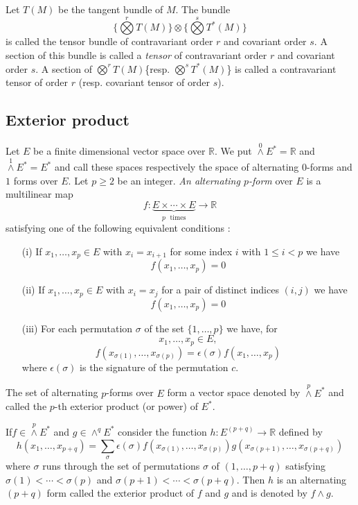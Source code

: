 Let $T(M)$ be the tangent bundle of $M$. The bundle 
$$
\{\bigotimes\limits^{r}T(M)\}\otimes \{\bigotimes\limits^{s}T^{*}(M)\}
$$ 
is called the tensor bundle of contravariant order $r$ and covariant order $s$. A section of this bundle is called a {\em tensor} of contravariant order $r$ and covariant order $s$. A section of $\bigotimes\limits^{r}T(M)$\pageoriginale \{resp. $\bigotimes\limits^{s}T^{*}(M)$\} is called a contravariant tensor of order $r$ (resp. covariant tensor of order $s$).

\subsection*{Exterior product}

Let $E$ be a finite dimensional vector space over $\mathbb{R}$. We put ${\displaystyle{\mathop{\wedge}\limits^{0}}}E^{*}=\mathbb{R}$ and ${\displaystyle{\mathop{\wedge}\limits^{1}}}E^{*}=E^{*}$ and call these spaces respectively the space of alternating $0$-forms and $1$ forms over $E$. Let $p\geq 2$ be an integer. {\em An alternating $p$-form} over $E$ is a multilinear map
$$
f:\underbrace{E\times \cdots \times E}_{p\text{~ times}}\to \mathbb{R}
$$
satisfying one of the following equivalent conditions :
\begin{itemize}
\item[(i)] If $x_{1},\ldots,x_{p}\in E$ with $x_{i}=x_{i+1}$ for some index $i$ with $1\leq i<p$ we have
$$
f(x_{1},\ldots,x_{p})=0
$$

\item[(ii)] If $x_{1},\ldots,x_{p}\in E$ with $x_{i}=x_{j}$ for a pair of distinct indices $(i,j)$ we have
$$
f(x_{1},\ldots,x_{p})=0
$$

\item[(iii)] For each permutation $\sigma$ of the set $\{1,\ldots,p\}$ we have, for 
$$
x_{1},\ldots,x_{p}\in E,
$$
$$
f(x_{\sigma(1)},\ldots,x_{\sigma(p)})=\epsilon(\sigma)f(x_{1},\ldots,x_{p})
$$
where $\epsilon(\sigma)$ is the signature of the permutation $c$.
\end{itemize}

The set of alternating $p$-forms over $E$ form a vector space denoted by ${\displaystyle{\mathop{\wedge}\limits^{p}}}E^{*}$ and called the $p$-th exterior product (or power) of $E^{*}$.

If\pageoriginale $f\in {\displaystyle{\mathop{\wedge}\limits^{p}}} E^{*}$ and $g\in {\displaystyle{\mathop{\wedge}^{q}}}E^{*}$ consider the function $h:E^{(p+q)}\to \mathbb{R}$ defined by
$$
h(x_{1},\ldots,x_{p+q})=\sum\limits_{\sigma}\epsilon(\sigma)f(x_{\sigma(1)},\ldots,x_{\sigma(p)})g(x_{\sigma(p+1)},\ldots,x_{\sigma(p+q)})
$$
where $\sigma$ runs through the set of permutations $\sigma$ of $(1,\ldots,p+q)$ satisfying $\sigma(1)<\cdots<\sigma(p)$ and $\sigma(p+1)<\cdots<\sigma(p+q)$. Then $h$ is an alternating $(p+q)$ form called the exterior product of $f$ and $g$ and is denoted by $f\wedge g$.\label{page13}

